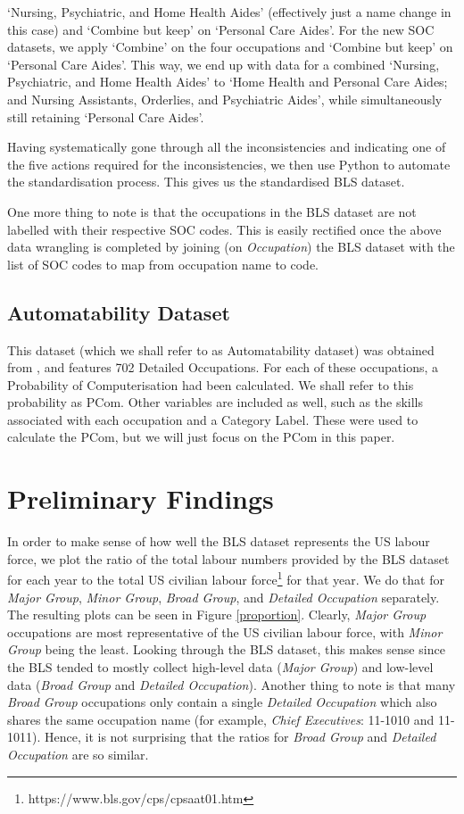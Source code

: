 \documentclass[11pt]{article}
\begin{document}
`Nursing, Psychiatric, and Home Health Aides' (effectively just a name change in this case) and `Combine but keep' on `Personal Care Aides'. For the new SOC datasets, we apply `Combine' on the four occupations and `Combine but keep' on `Personal Care Aides'. This way, we end up with data for a combined `Nursing, Psychiatric, and Home Health Aides' to `Home Health and Personal Care Aides; and Nursing Assistants, Orderlies, and Psychiatric Aides', while simultaneously still retaining `Personal Care Aides'.

Having systematically gone through all the inconsistencies and indicating one of the five actions required for the inconsistencies, we then use Python to automate the standardisation process. This gives us the standardised BLS dataset.

One more thing to note is that the occupations in the BLS dataset are not labelled with their respective SOC codes. This is easily rectified once the above data wrangling is completed by joining (on \emph{Occupation}) the BLS dataset with the list of SOC codes to map from occupation name to code.

\subsection{Automatability Dataset}

This dataset (which we shall refer to as Automatability dataset) was obtained from \cite{futureofemployment}, and features 702 Detailed Occupations. For each of these occupations, a Probability of Computerisation had been calculated. We shall refer to this probability as PCom. Other variables are included as well, such as the skills associated with each occupation and a Category Label. These were used to calculate the PCom, but we will just focus on the PCom in this paper.

\newpage

\section{Preliminary Findings}
\label{sec:prelim findings}

In order to make sense of how well the BLS dataset represents the US labour force, we plot the ratio of the total labour numbers provided by the BLS dataset for each year to the total US civilian labour force\footnote{https://www.bls.gov/cps/cpsaat01.htm} for that year. We do that for \emph{Major Group}, \emph{Minor Group}, \emph{Broad Group}, and \emph{Detailed Occupation} separately. The resulting plots can be seen in Figure \ref{proportion}. Clearly, \emph{Major Group} occupations are most representative of the US civilian labour force, with \emph{Minor Group} being the least. Looking through the BLS dataset, this makes sense since the BLS tended to mostly collect high-level data (\emph{Major Group}) and low-level data (\emph{Broad Group} and \emph{Detailed Occupation}). Another thing to note is that many \emph{Broad Group} occupations only contain a single \emph{Detailed Occupation} which also shares the same occupation name (for example, \emph{Chief Executives}: 11-1010 and 11-1011). Hence, it is not surprising that the ratios for \emph{Broad Group} and \emph{Detailed Occupation} are so similar.
\end{document}
